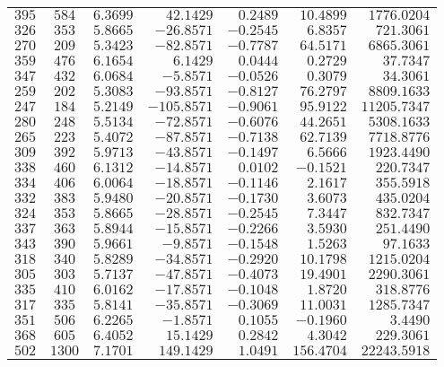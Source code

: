 \begin{tabular}{cccrrrr}
$395$ & $584$  & $6.3699$ & $42.1429$   & $0.2489$  & $10.4899$      & $1776.0204$     \\
$326$ & $353$  & $5.8665$ & $-26.8571$  & $-0.2545$ & $6.8357$       & $721.3061$      \\
$270$ & $209$  & $5.3423$ & $-82.8571$  & $-0.7787$ & $64.5171$      & $6865.3061$     \\
$359$ & $476$  & $6.1654$ & $6.1429$    & $0.0444$  & $0.2729$       & $37.7347$       \\
$347$ & $432$  & $6.0684$ & $-5.8571$   & $-0.0526$ & $0.3079$       & $34.3061$       \\
$259$ & $202$  & $5.3083$ & $-93.8571$  & $-0.8127$ & $76.2797$      & $8809.1633$     \\
$247$ & $184$  & $5.2149$ & $-105.8571$ & $-0.9061$ & $95.9122$      & $11205.7347$    \\
$280$ & $248$  & $5.5134$ & $-72.8571$  & $-0.6076$ & $44.2651$      & $5308.1633$     \\
$265$ & $223$  & $5.4072$ & $-87.8571$  & $-0.7138$ & $62.7139$      & $7718.8776$     \\
$309$ & $392$  & $5.9713$ & $-43.8571$  & $-0.1497$ & $6.5666$       & $1923.4490$     \\
$338$ & $460$  & $6.1312$ & $-14.8571$  & $0.0102$  & $-0.1521$      & $220.7347$      \\
$334$ & $406$  & $6.0064$ & $-18.8571$  & $-0.1146$ & $2.1617$       & $355.5918$      \\
$332$ & $383$  & $5.9480$ & $-20.8571$  & $-0.1730$ & $3.6073$       & $435.0204$      \\
$324$ & $353$  & $5.8665$ & $-28.8571$  & $-0.2545$ & $7.3447$       & $832.7347$      \\
$337$ & $363$  & $5.8944$ & $-15.8571$  & $-0.2266$ & $3.5930$       & $251.4490$      \\
$343$ & $390$  & $5.9661$ & $-9.8571$   & $-0.1548$ & $1.5263$       & $97.1633$       \\
$318$ & $340$  & $5.8289$ & $-34.8571$  & $-0.2920$ & $10.1798$      & $1215.0204$     \\
$305$ & $303$  & $5.7137$ & $-47.8571$  & $-0.4073$ & $19.4901$      & $2290.3061$     \\
$335$ & $410$  & $6.0162$ & $-17.8571$  & $-0.1048$ & $1.8720$       & $318.8776$      \\
$317$ & $335$  & $5.8141$ & $-35.8571$  & $-0.3069$ & $11.0031$      & $1285.7347$     \\
$351$ & $506$  & $6.2265$ & $-1.8571$   & $0.1055$  & $-0.1960$      & $3.4490$        \\
$368$ & $605$  & $6.4052$ & $15.1429$   & $0.2842$  & $4.3042$       & $229.3061$      \\
$502$ & $1300$ & $7.1701$ & $149.1429$  & $1.0491$  & $156.4704$     & $22243.5918$    \\\bottomrule
\end{tabular}
